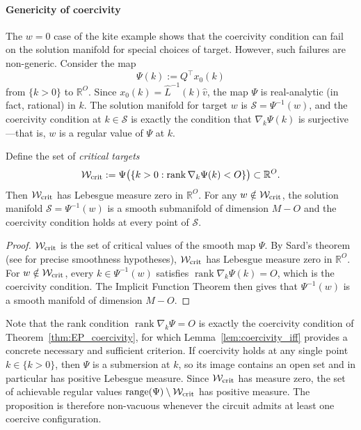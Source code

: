 \documentclass{siamart}
\begin{document}
\paragraph{Genericity of coercivity}  The $w=0$ case of the kite example shows that the coercivity condition can fail on the solution manifold for special choices of target. However, such failures are non-generic. Consider the map
\[
\Psi(k) := Q^\top x_0(k)
\]
from $\{k>0\}$ to $\mathbb{R}^O$. Since $x_0(k) = \hat{L}^{-1}(k)\hat{v}$, the map $\Psi$ is real-analytic (in fact, rational) in $k$. The solution manifold for target $w$ is $\mathcal{S} = \Psi^{-1}(w)$, and the coercivity condition at $k \in \mathcal{S}$ is exactly the condition that $\nabla_k\Psi(k)$ is surjective---that is, $w$ is a regular value of $\Psi$ at $k$.

\begin{proposition}
\label{prop:genericity}
Define the set of \emph{critical targets}
\[
\mathcal{W}_{\rm crit} := \Psi\big(\{k > 0 : \operatorname{rank} \nabla_k\Psi(k) < O\}\big) \subset \mathbb{R}^O.
\]
Then $\mathcal{W}_{\rm crit}$ has Lebesgue measure zero in $\mathbb{R}^O$. For any $w \notin \mathcal{W}_{\rm crit}$, the solution manifold $\mathcal{S} = \Psi^{-1}(w)$ is a smooth submanifold of dimension $M-O$ and the coercivity condition holds at every point of $\mathcal{S}$.
\end{proposition}

\begin{proof}
$\mathcal{W}_{\rm crit}$ is the set of critical values of the smooth map $\Psi$. By Sard's theorem (see \cite{bates1993} for precise smoothness hypotheses), $\mathcal{W}_{\rm crit}$ has Lebesgue measure zero in $\mathbb{R}^O$. For $w \notin \mathcal{W}_{\rm crit}$, every $k \in \Psi^{-1}(w)$ satisfies $\operatorname{rank} \nabla_k\Psi(k) = O$, which is the coercivity condition. The Implicit Function Theorem then gives that $\Psi^{-1}(w)$ is a smooth manifold of dimension $M-O$.
\end{proof}

Note that the rank condition $\operatorname{rank}\nabla_k\Psi = O$ is exactly the coercivity condition of Theorem~\ref{thm:EP_coercivity}, for which Lemma~\ref{lem:coercivity_iff} provides a concrete necessary and sufficient criterion. If coercivity holds at any single point $k \in \{k > 0\}$, then $\Psi$ is a submersion at $k$, so its image contains an open set and in particular has positive Lebesgue measure. Since $\mathcal{W}_{\rm crit}$ has measure zero, the set of achievable regular values $\operatorname{range}(\Psi) \setminus \mathcal{W}_{\rm crit}$ has positive measure. The proposition is therefore non-vacuous whenever the circuit admits at least one coercive configuration.
\end{document}
